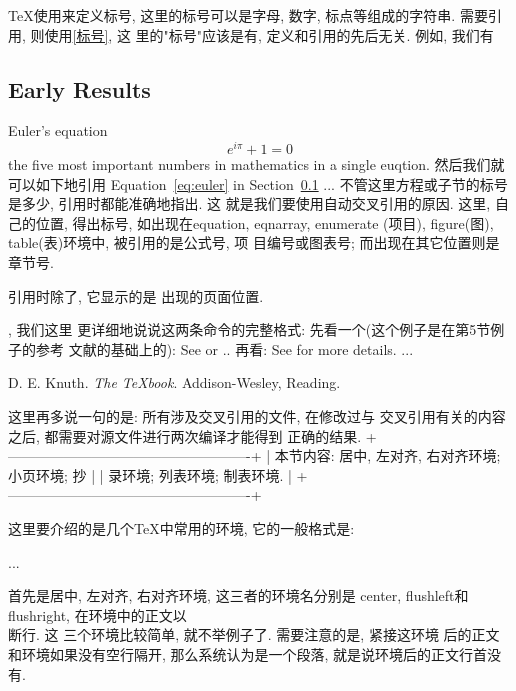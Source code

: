 \begin{center}
    TeX使用来定义标号, 这里的标号可以是字母, 
数字, 标点等组成的字符串. 需要引用, 则使用\ref{标号}, 这 
里的"标号"应该是有, 定义和引用的先后无关. 
例如, 我们有 
\subsection{Early Results} 
\label{sec-early}                       %
Euler's equation 
\begin{equation} 
e^{i\pi}+1=0 \label{eq:euler}           %
\end{equation} 
\combines the five most important numbers in mathematics 
in a single euqtion. 
然后我们就可以如下地引用 
Equation~\ref{eq:euler} in Section~\ref{sec-early} ... 
不管这里方程或子节的标号是多少, 引用时都能准确地指出. 这 
就是我们要使用自动交叉引用的原因. 这里,  
自己的位置, 得出标号, 如出现在equation, eqnarray, enumerate 
(项目), figure(图), table(表)环境中, 被引用的是公式号, 项 
目编号或图表号; 而出现在其它位置则是章节号. 
  
    引用时除了\pageref{标号}, 它显示的是 
\label{标号}出现的页面位置. 
  
    , 我们这里 
更详细地说说这两条命令的完整格式: 
\cite[附加信息]{标号1, 标号2, ..., 标号n} 
先看一个(这个例子是在第5节例子的参考 
文献的基础上的): 
See \cite{texbook, companion} or \cite[page 20-22]{lamport} .. 
再看: 
See \cite{kn:texbook} for more details. 
... 
\begin{thebibliography}[lamport 86]     %
 D. E. Knuth. {\sl The \TeX{}book}. 
Addison-Wesley, Reading. 
\end{thebibliography} 
  
    这里再多说一句的是: 所有涉及交叉引用的文件, 在修改过与 
交叉引用有关的内容之后, 都需要对源文件进行两次编译才能得到 
正确的结果. 
  +----------------------------------------------------+ 
  |  本节内容: 居中, 左对齐, 右对齐环境; 小页环境; 抄  | 
  |  录环境; 列表环境; 制表环境.                       | 
  +----------------------------------------------------+ 
  
    这里要介绍的是几个TeX中常用的环境, 它的一般格式是: 
\begin{环境名} 
... 
\end{环境名} 
  
    首先是居中, 左对齐, 右对齐环境, 这三者的环境名分别是 
center, flushleft和flushright, 在环境中的正文以\\断行. 这 
三个环境比较简单, 就不举例子了. 需要注意的是, 紧接这环境 
后的正文和环境如果没有空行隔开, 那么系统认为是一个段落, 
就是说环境后的正文行首没有. 
  

\end{center}
